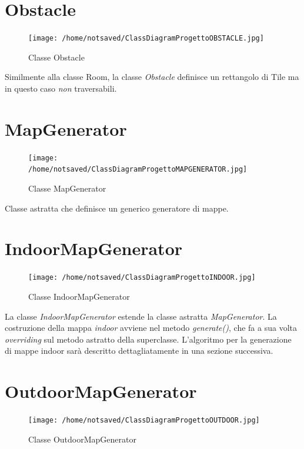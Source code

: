 \documentclass[11pt]{book}
\begin{document}
\section{Obstacle}
\begin{figure}[H]
\centering
\texttt{[image: /home/notsaved/ClassDiagramProgettoOBSTACLE.jpg]}
\caption{Classe Obstacle}
\label{classobstacle}
\end{figure}

Similmente alla classe Room, la classe \emph{Obstacle} definisce un rettangolo di Tile ma in questo caso \emph{non} traversabili.

\section{MapGenerator}
\begin{figure}[H]
\centering
\texttt{[image: /home/notsaved/ClassDiagramProgettoMAPGENERATOR.jpg]}
\caption{Classe MapGenerator}
\label{classmapgenerator}
\end{figure}

Classe astratta che definisce un generico generatore di mappe.

\section{IndoorMapGenerator}

\begin{figure}[H]
\centering
\texttt{[image: /home/notsaved/ClassDiagramProgettoINDOOR.jpg]}
\caption{Classe IndoorMapGenerator}
\label{Classe IndoorMapGenerator}
\end{figure}

La classe \emph{IndoorMapGenerator} estende la classe astratta \emph{MapGenerator}. La costruzione della mappa \emph{indoor} avviene nel metodo \emph{generate()}, che fa a sua volta \emph{overriding} sul metodo astratto della superclasse. L'algoritmo per la generazione di mappe indoor sar\`a descritto dettagliatamente in una sezione successiva. 

\section{OutdoorMapGenerator}

\begin{figure}[H]
\centering
\texttt{[image: /home/notsaved/ClassDiagramProgettoOUTDOOR.jpg]}
\caption{Classe OutdoorMapGenerator}
\label{classoutdoorgenerator}
\end{figure}
\end{document}
